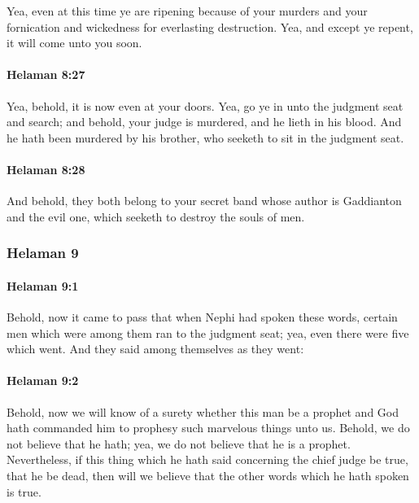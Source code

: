 			Yea, even at this time ye are ripening
			because of your murders and your fornication and wickedness
			for everlasting destruction.
			Yea, and except ye repent,
			it will come unto you soon.

		\paragraph{Helaman 8:27} %
			\label{HELAMAN-8-27}

			Yea, behold, it is now even at your doors.
			Yea, go ye in unto the judgment seat and search;
			and behold, your judge is murdered,
			and he lieth in his blood.
			And he hath been murdered by his brother,
			who seeketh to sit in the judgment seat.

		\paragraph{Helaman 8:28} %
			\label{HELAMAN-8-28}

			And behold, they both belong to your secret band
			whose author is Gaddianton and the evil one,
			which seeketh to destroy the souls of men.

	\subsubsection{Helaman 9} %
		\label{HELAMAN-9}
		
		\paragraph{Helaman 9:1} %
			\label{HELAMAN-9-1}

			Behold, now it came to pass that
			when Nephi had spoken these words,
			certain men which were among them ran to the judgment seat;
			yea, even there were five which went.
			And they said among themselves as they went:

		\paragraph{Helaman 9:2} %
			\label{HELAMAN-9-2}

			Behold, now we will know of a surety
			whether this man be a prophet
			and God hath commanded him
			to prophesy such marvelous things unto us.
			Behold, we do not believe that he hath;
			yea, we do not believe that he is a prophet.
			Nevertheless, if this thing
			which he hath said concerning the chief judge be true,
			that he be dead,
			then will we believe
			that the other words which he hath spoken is true.


